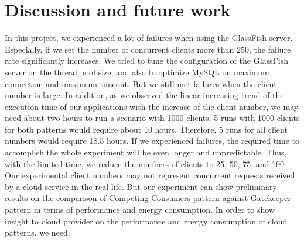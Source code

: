 \documentclass{article}
\begin{document}
\section{Discussion and future work}
In this project, we experienced a lot of failures when using the GlassFish server. Especially, if we set the number of concurrent clients more than 250, the failure rate significantly increases. We tried to tune the configuration of the GlassFish server on the thread pool size, and also to optimize MySQL on maximum connection and maximum timeout. But we still met failures when the client number is large. In addition, as we observed the linear increasing trend of the execution time of our applications with the increase of the client number, we may need about two hours to run a scenario with 1000 clients. 5 runs with 1000 clients for both patterns would require about 10 hours. Therefore, 5 runs for all client numbers would require 18.5 hours. If we experienced failures, the required time to accomplish the whole experiment will be even longer and unpredictable. Thus, with the limited time, we reduce the numbers of clients to 25, 50, 75, and 100. Our experimental client numbers may not represent concurrent requests received by a cloud service in the real-life. But our experiment can show preliminary results on the comparison of Competing Consumers pattern against Gatekeeper pattern in terms of performance and energy consumption. In order to show insight to cloud provider on the performance and energy consumption of cloud patterns, we need:\\
\end{document}
